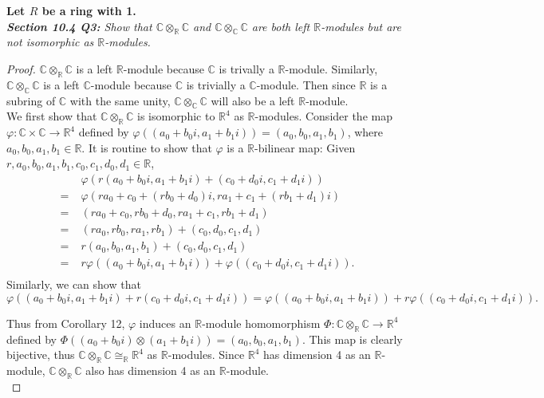 \documentclass{article}
\begin{document}
\textbf{Let $R$ be a ring with 1.} \\

\it \textbf{Section 10.4 Q3:} Show that
  $\mathbb{C}\otimes_\mathbb{R}\mathbb{C}$ and
  $\mathbb{C}\otimes_\mathbb{C}\mathbb{C}$ are both left
  $\mathbb{R}$-modules but are not isomorphic as $\mathbb{R}$-modules.

  \begin{proof}
    $\mathbb{C}\otimes_\mathbb{R}\mathbb{C}$ is a left $\mathbb{R}$-module
    because $\mathbb{C}$ is trivally a $\mathbb{R}$-module. Similarly,
    $\mathbb{C}\otimes_\mathbb{C}\mathbb{C}$ is a left $\mathbb{C}$-module
    because $\mathbb{C}$ is trivially a $\mathbb{C}$-module. Then since
    $\mathbb{R}$ is a subring of $\mathbb{C}$ with the same unity,
    $\mathbb{C}\otimes_\mathbb{C}\mathbb{C}$ will also be a left
    $\mathbb{R}$-module. \\

    We first show that $\mathbb{C}\otimes_\mathbb{R}\mathbb{C}$ is
    isomorphic to $\mathbb{R}^4$ as $\mathbb{R}$-modules. Consider the map
    $\varphi:\mathbb{C}\times\mathbb{C}\rightarrow\mathbb{R}^4$ defined by
    $\varphi((a_0+b_0i,a_1+b_1i))=(a_0,b_0,a_1,b_1)$, where
    $a_0,b_0,a_1,b_1\in\mathbb{R}$. It is routine to show that $\varphi$ is
    a $\mathbb{R}$-bilinear map: Given
    $r,a_0,b_0,a_1,b_1,c_0,c_1,d_0,d_1\in\mathbb{R}$,
    \begin{align*}
      \;&\varphi(r(a_0+b_0i,a_1+b_1i)+(c_0+d_0i,c_1+d_1i))\\
      =\;&\varphi(ra_0+c_0+(rb_0+d_0)i, ra_1+c_1+(rb_1+d_1)i)\\
      =\;&(ra_0+c_0, rb_0+d_0, ra_1+c_1, rb_1+d_1)\\
      =\;&(ra_0,rb_0,ra_1,rb_1) +(c_0,d_0,c_1,d_1)\\
      =\;&r(a_0,b_0,a_1,b_1) +(c_0,d_0,c_1,d_1)\\
      =\;&r\varphi((a_0+b_0i,a_1+b_1i)) +\varphi((c_0+d_0i,c_1+d_1i)).\\
    \end{align*}
    Similarly, we can show that
    \[\varphi((a_0+b_0i,a_1+b_1i)+r(c_0+d_0i,c_1+d_1i))
    =\varphi((a_0+b_0i,a_1+b_1i)) +r\varphi((c_0+d_0i,c_1+d_1i)).\]

    Thus from Corollary 12, $\varphi$ induces an $\mathbb{R}$-module
    homomorphism $\Phi:\mathbb{C}\otimes_\mathbb{R}\mathbb{C}\rightarrow
    \mathbb{R}^4$ defined by
    $\Phi((a_0+b_0i)\otimes(a_1+b_1i))=(a_0,b_0,a_1,b_1)$. This map is
    clearly bijective, thus $\mathbb{C}\otimes_\mathbb{R}\mathbb{C}
    \cong_\mathbb{R}\mathbb{R}^4$ as $\mathbb{R}$-modules. Since
    $\mathbb{R}^4$ has dimension 4 as an $\mathbb{R}$-module,
    $\mathbb{C}\otimes_\mathbb{R}\mathbb{C}$ also has dimension 4 as an
    $\mathbb{R}$-module. \\


\end{proof}
\end{document}
